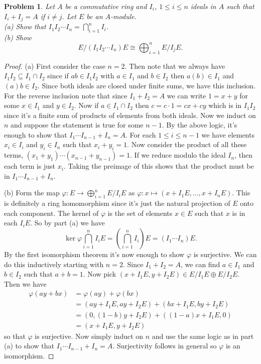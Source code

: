 \documentclass{article}
\newtheorem{problem}{Problem}
\begin{document}
\begin{problem}
Let $A$ be a commutative ring and $I_i$, $1 \leq i \leq n$ ideals in $A$ such that $I_i + I_j = A$ if $i \neq j$. Let $E$ be an $A$-module.\\
(a) Show that $I_1 I_2 \cdots I_n = \bigcap_{i=1}^n I_i$.\\
(b) Show
\[
E/(I_1 I_2 \cdots I_n)E \cong \bigoplus_{i=1}^n E/I_jE.
\]
\end{problem}
\begin{proof}
(a) First consider the case $n = 2$. Then note that we always have $I_1I_2 \subseteq I_1 \cap I_2$ since if $ab \in I_1I_2$ with $a \in I_1$ and $b \in I_2$ then $a(b) \in I_1$ and $(a)b \in I_2$. Since both ideals are closed under finite sums, we have this inclusion. For the reverse inclusion note that since $I_1 + I_2 = A$ we can write $1 = x+y$ for some $x \in I_1$ and $y \in I_2$. Now if $a \in I_1 \cap I_2$ then $c = c \cdot 1 = cx + cy$ which is in $I_1I_2$ since it's a finite sum of products of elements from both ideals. Now we induct on $n$ and suppose the statement is true for some $n-1$. By the above logic, it's enough to show that $I_1 \cdots I_{n-1} + I_n = A$. For each $1 \leq i \leq n-1$ we have elements $x_i \in I_i$ and $y_i \in I_n$ such that $x_i + y_i = 1$. Now consider the product of all these terms, $(x_1 + y_1) \cdots (x_{n-1} + y_{n-1}) = 1$. If we reduce modulo the ideal $I_n$, then each term is just $x_i$. Taking the preimage of this shows that the product must be in $I_1 \cdots I_{n-1} + I_n$.

(b) Form the map $\varphi : E \to \bigoplus_{i=1}^n E/I_iE$ as $\varphi : x \mapsto (x + I_1E, \dots , x + I_nE)$. This is definitely a ring homomorphism since it's just the natural projection of $E$ onto each component. The kernel of $\varphi$ is the set of elements $x \in E$ such that $x$ is in each $I_iE$. So by part (a) we have
\[
\ker \varphi \bigcap_{i=1}^n I_iE = \left ( \bigcap_{i=1}^n I_i \right ) E = (I_1 \cdots I_n)E.
\]
By the first isomorphism theorem it's now enough to show $\varphi$ is surjective. We can do this inductively starting with $n = 2$. Since $I_1 + I_2 = A$, we can find $a \in I_1$ and $b \in I_2$ such that $a + b = 1$. Now pick $(x + I_1E, y + I_2E) \in E/I_1E \oplus E/I_2E$. Then we have
\begin{align*}
\varphi(ay + bx)
&= \varphi(ay) + \varphi(bx)\\
&= (ay + I_1E, ay + I_2E) + (bx + I_1E, by + I_2E)\\
&= (0, (1-b)y + I_2E) + ((1-a)x + I_1E, 0)\\
&= (x + I_1E, y + I_2E)
\end{align*}
so that $\varphi$ is surjective. Now simply induct on $n$ and use the same logic as in part (a) to show that $I_1 \cdots I_{n-1} + I_n = A$. Surjectivity follows in general so $\varphi$ is an isomorphism.
\end{proof}
\end{document}
